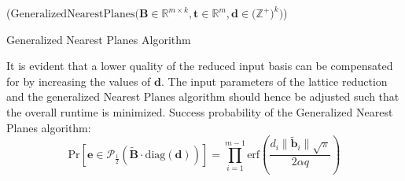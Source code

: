 \begin{algorithm2e}
  \Begin($\text{GeneralizedNearestPlanes} {(} \mathbf{B} \in \mathbb{R}^{m \times k},\mathbf{t} \in \mathbb{R}^{m}, \mathbf{d} \in {(}\mathbb{Z}^+{)}^k {)}$)
    { %
  }
  \caption{Generalized Nearest Planes Algorithm \cite{LP11}}\label{alg:GeneralizedNearestPlanes}
\end{algorithm2e}

It is evident that a lower quality of the reduced input basis can be compensated for by increasing the values of $\mathbf{d}$. The input parameters of the lattice reduction and the generalized Nearest Planes algorithm should hence be adjusted such that the overall runtime is minimized. %
Success probability of the Generalized Nearest Planes algorithm:
\begin{equation}
  \text{Pr}\left[ \mathbf{e} \in \mathcal{P}_{\frac{1}{2}}(\tilde{\mathbf{B}} \cdot \text{diag}(\mathbf{d}))\right] = \prod_{i=1}^{m-1} \text{erf}\left(\frac{d_i \|\tilde{\mathbf{b}}_i\| \sqrt{\pi}}{2\alpha q}\right)
\end{equation} %







